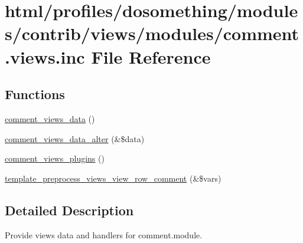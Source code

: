 \hypertarget{comment_8views_8inc}{
\section{html/profiles/dosomething/modules/contrib/views/modules/comment.views.inc File Reference}
\label{comment_8views_8inc}
}
\subsection*{Functions}
\begin{DoxyCompactItemize}
\item 
\hyperlink{comment_8views_8inc_a36dff975ac53893da10163d2ee59d652}{comment\_\-views\_\-data} ()
\item 
\hyperlink{comment_8views_8inc_af68bf474455d07d3fc30c9f61b830f30}{comment\_\-views\_\-data\_\-alter} (\&\$data)
\item 
\hyperlink{comment_8views_8inc_a20b0377d6793f1f1e1b70bcae9dd067b}{comment\_\-views\_\-plugins} ()
\item 
\hyperlink{comment_8views_8inc_ac5f17442ee6b1364544217dc2515f0ef}{template\_\-preprocess\_\-views\_\-view\_\-row\_\-comment} (\&\$vars)
\end{DoxyCompactItemize}


\subsection{Detailed Description}
Provide views data and handlers for comment.module. 

